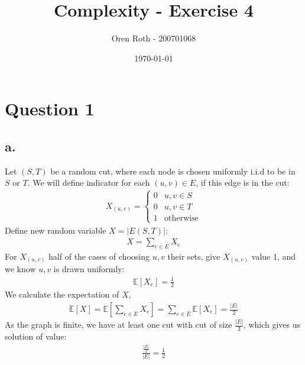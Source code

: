\documentclass[11pt]{article}
\title{Complexity - Exercise 4}
\author{Oren Roth - 200701068}
\date{\today}
\theoremstyle{plain}
\theoremstyle{nonumberplainnobrackets}
\begin{document}
\maketitle
\section*{Question 1}
\subsection*{a.} Let $(S,T)$ be a random cut, where each node is chosen uniformly  i.i.d  to be in $S$ or $T$. We will define indicator for each $(u,v)\in E$, if this edge is in the cut:
\begin{align*}
X_{(u,v)} = \begin{cases}
0  & u,v\in S \\
0  & u,v\in T \\
1  & \text{otherwise}
\end{cases} 
\end{align*}
Define new random variable $X=|E(S,T)|$:
\begin{align*}
X = \sum_{e\in E} X_e
\end{align*}
For $X_{(u,v)}$ half of the cases of choosing $u,v$ their sets, give $X_{(u,v)}$ value 1, and we know $u,v$ is drawn uniformly:
\begin{align*}
\mathbb{E}[X_e] = \frac{1}{2}
\end{align*}
We calculate the expectation of $X$,
\begin{align*}
\mathbb{E}[X] = \mathbb{E}[\sum_{e\in E} X_e] = \sum_{e\in E} \mathbb{E}[X_e] = \frac{|E|}{2}
\end{align*}
As the graph is finite, we have at least one cut with cut of size $\frac{|E|}{2}$, which gives us solution of value:
\begin{align*}
\frac{\frac{|E|}{2}}{|E|} = \frac{1}{2}
\end{align*}
\end{document}
